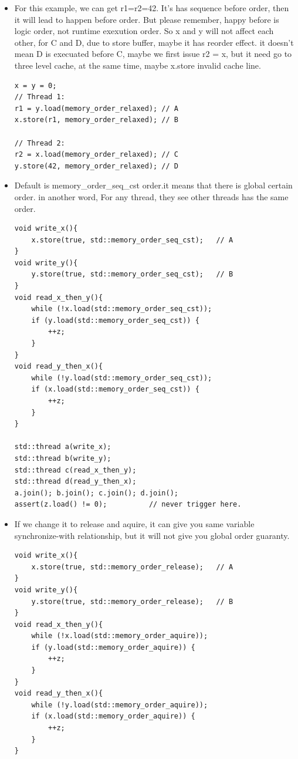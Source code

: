 \documentclass[a4paper,11pt,twoside]{book}
\begin{document}
\begin{itemize}

		\item For this example, we can get r1=r2=42. It's has sequence before order, then it will lead to happen before order. But please remember, happy before is logic order, not runtime exexution order. So x and y will not affect each other, for C and D, due to store buffer, maybe it has reorder effect. it doesn't mean D is execuated before C, maybe we first issue r2 = x, but it need go to three level cache, at the same time, maybe x.store invalid cache line. 

\begin{lstlisting}
x = y = 0;
// Thread 1:
r1 = y.load(memory_order_relaxed); // A
x.store(r1, memory_order_relaxed); // B

// Thread 2:
r2 = x.load(memory_order_relaxed); // C
y.store(42, memory_order_relaxed); // D
\end{lstlisting}


\item Default is memory\_order\_seq\_cst order.it means that there is global certain order. in another word, For any thread, they see other threads has the same order.  


\begin{lstlisting}
void write_x(){
    x.store(true, std::memory_order_seq_cst);	// A
}
void write_y(){
    y.store(true, std::memory_order_seq_cst);	// B
}
void read_x_then_y(){
    while (!x.load(std::memory_order_seq_cst));
    if (y.load(std::memory_order_seq_cst)) {
        ++z;
    }
}
void read_y_then_x(){
    while (!y.load(std::memory_order_seq_cst));
    if (x.load(std::memory_order_seq_cst)) {
        ++z;
    }
}
 
std::thread a(write_x);
std::thread b(write_y);
std::thread c(read_x_then_y);
std::thread d(read_y_then_x);
a.join(); b.join(); c.join(); d.join();
assert(z.load() != 0);			// never trigger here.
\end{lstlisting}

\item If we change it to release and aquire, it can give you same variable synchronize-with relationship, but it will not give you global order guaranty.  

\begin{lstlisting}
void write_x(){
    x.store(true, std::memory_order_release);	// A
}
void write_y(){
    y.store(true, std::memory_order_release);	// B
} 
void read_x_then_y(){
    while (!x.load(std::memory_order_aquire));
    if (y.load(std::memory_order_aquire)) {
        ++z;
    }
}
void read_y_then_x(){
    while (!y.load(std::memory_order_aquire));
    if (x.load(std::memory_order_aquire)) {
        ++z;
    }
}
 

\end{lstlisting}
\end{itemize}
\end{document}
